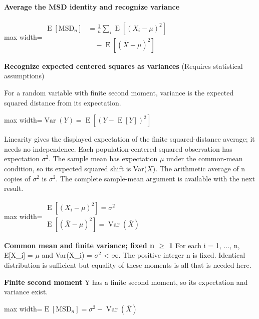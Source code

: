 \documentclass[11pt,a4paper]{article}
\begin{document}
\paragraph{Average the MSD identity and recognize variance}
\begin{center}\begin{adjustbox}{max width=\linewidth}$\displaystyle \begin{aligned}\operatorname{E}[\mathrm{MSD}_n]&=\frac1n\sum_i\operatorname{E}[(X_i-\mu)^2]\\&\quad-\operatorname{E}[(\bar X-\mu)^2]\end{aligned}$\end{adjustbox}\end{center}
\noindent\textbf{Recognize expected centered squares as variances} (Requires statistical assumptions)\par
For a random variable with finite second moment, variance is the expected squared distance from its expectation.
\begin{center}\begin{adjustbox}{max width=\linewidth}$\displaystyle \operatorname{Var}(Y)=\operatorname{E}[(Y-\operatorname{E}[Y])^2]$\end{adjustbox}\end{center}

Linearity gives the displayed expectation of the finite squared-distance average; it needs no independence. Each population-centered squared observation has expectation \ensuremath{\sigma}\ensuremath{{}^2}. The sample mean has expectation \ensuremath{\mu} under the common-mean condition, so its expected squared shift is Var(\ensuremath{\bar{X}}). The arithmetic average of n copies of \ensuremath{\sigma}\ensuremath{{}^2} is \ensuremath{\sigma}\ensuremath{{}^2}. The complete sample-mean argument is available with the next result.
\begin{center}\begin{adjustbox}{max width=\linewidth}$\displaystyle \begin{gathered}\operatorname{E}[(X_i-\mu)^2]=\sigma^2\\\operatorname{E}[(\bar X-\mu)^2]=\operatorname{Var}(\bar X)\end{gathered}$\end{adjustbox}\end{center}

\par\textbf{Common mean and finite variance; fixed n \ensuremath{\ge} 1} For each i = 1, \ensuremath{\ldots}, n, E[X\_i] = \ensuremath{\mu} and Var(X\_i) = \ensuremath{\sigma}\ensuremath{{}^2} < \ensuremath{\infty}. The positive integer n is fixed. Identical distribution is sufficient but equality of these moments is all that is needed here.
\par\textbf{Finite second moment} Y has a finite second moment, so its expectation and variance exist.
\begin{center}\begin{adjustbox}{max width=\linewidth}$\displaystyle \operatorname{E}[\mathrm{MSD}_n]=\sigma^2-\operatorname{Var}(\bar X)$\end{adjustbox}\end{center}
\end{document}
